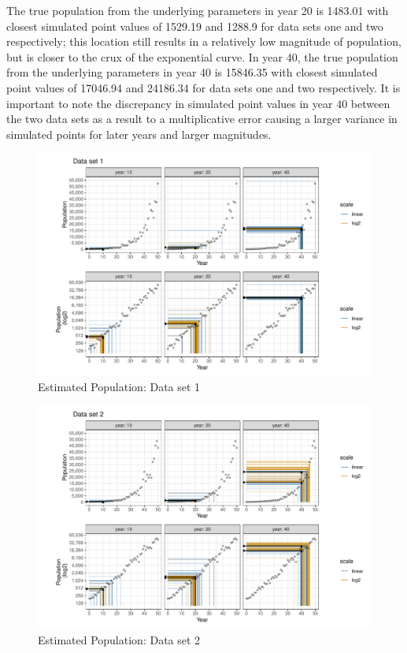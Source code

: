 \documentclass[print]{nuthesis}
\begin{document}
The true population from the underlying parameters in year 20 is 1483.01 with closest simulated point values of 1529.19 and 1288.9 for data sets one and two respectively; this location still results in a relatively low magnitude of population, but is closer to the crux of the exponential curve.
In year 40, the true population from the underlying parameters in year 40 is 15846.35 with closest simulated point values of 17046.94 and 24186.34 for data sets one and two respectively.
It is important to note the discrepancy in simulated point values in year 40 between the two data sets as a result to a multiplicative error causing a larger variance in simulated points for later years and larger magnitudes.

\begin{figure}[tbp]

{\centering \includegraphics[width=1\linewidth,]{thesis_files/figure-latex/spaghetti-dataset1-1} 

}

\caption{Estimated Population: Data set 1}\label{fig:spaghetti-dataset1}
\end{figure}

\begin{figure}[tbp]

{\centering \includegraphics[width=1\linewidth,]{thesis_files/figure-latex/spaghetti-dataset2-1} 

}

\caption{Estimated Population: Data set 2}\label{fig:spaghetti-dataset2}
\end{figure}
\end{document}
